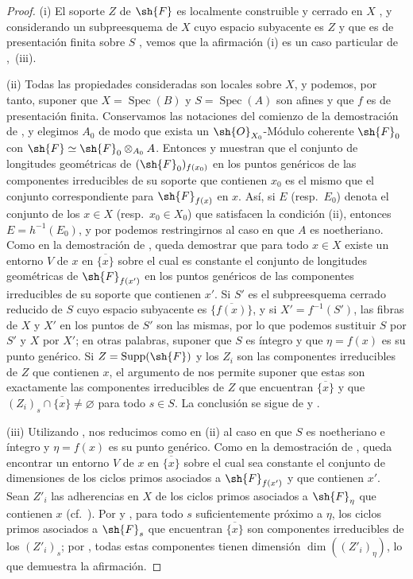 \begin{proof}
\label{IV.9.9.2-proof}
(i) El soporte $Z$ de $\sh{F}$ es localmente construible y cerrado en $X$ , y considerando un subpreesquema de $X$ cuyo espacio subyacente es $Z$ y que es de presentación finita sobre $S$ , vemos que la afirmación (i) es un caso particular de ,~(iii).

(ii) Todas las propiedades consideradas son locales sobre $X$, y podemos, por tanto, suponer que $X=\operatorname{Spec}(B)$ y $S=\operatorname{Spec}(A)$ son afines y que $f$ es de presentación finita.
Conservamos las notaciones del comienzo de la demostración de , y elegimos $A_0$ de modo que exista un $\sh{O}_{X_0}$-Módulo coherente $\sh{F}_0$ con $\sh{F}\simeq\sh{F}_0\otimes_{A_0}A$.
Entonces  y  muestran que el conjunto de longitudes geométricas de $(\sh{F}_0)_{f(x_0)}$ en los puntos genéricos de las componentes irreducibles de su soporte que contienen $x_0$ es el mismo que el conjunto correspondiente para $\sh{F}_{f(x)}$ en $x$.
Así, si $E$ (resp.~$E_0$) denota el conjunto de los $x\in X$ (resp.~$x_0\in X_0$) que satisfacen la condición (ii), entonces $E=h^{-1}(E_0)$, y por  podemos restringirnos al caso en que $A$ es noetheriano.
Como en la demostración de , queda demostrar que para todo $x\in X$ existe un entorno $V$ de $x$ en $\overline{\{x\}}$ sobre el cual es constante el conjunto de longitudes geométricas de $\sh{F}_{f(x')}$ en los puntos genéricos de las componentes irreducibles de su soporte que contienen $x'$.
Si $S'$ es el subpreesquema cerrado reducido de $S$ cuyo espacio subyacente es $\overline{\{f(x)\}}$, y si $X'=f^{-1}(S')$, las fibras de $X$ y $X'$ en los puntos de $S'$ son las mismas,
por lo que podemos sustituir $S$ por $S'$ y $X$ por $X'$; en otras palabras, suponer que $S$ es íntegro y que $\eta=f(x)$ es su punto genérico.
Si $Z=\operatorname{Supp}(\sh{F})$ y los $Z_i$ son las componentes irreducibles de $Z$ que contienen $x$, el argumento de  nos permite suponer que estas son exactamente las componentes irreducibles de $Z$ que encuentran $\overline{\{x\}}$ y que $(Z_i)_s\cap\overline{\{x\}}\neq\varnothing$ para todo $s\in S$.
La conclusión se sigue de  y .

(iii) Utilizando , nos reducimos como en (ii) al caso en que $S$ es noetheriano e íntegro y $\eta=f(x)$ es su punto genérico.
Como en la demostración de , queda encontrar un entorno $V$ de $x$ en $\overline{\{x\}}$ sobre el cual sea constante el conjunto de dimensiones de los ciclos primos asociados a $\sh{F}_{f(x')}$ y que contienen $x'$.
Sean $Z'_i$ las adherencias en $X$ de los ciclos primos asociados a $\sh{F}_\eta$ que contienen $x$ (cf.~).
Por  y , para todo $s$ suficientemente próximo a $\eta$, los ciclos primos asociados a $\sh{F}_s$ que encuentran $\overline{\{x\}}$ son componentes irreducibles de los $(Z'_i)_s$; por , todas estas componentes tienen dimensión $\dim((Z'_i)_\eta)$, lo que demuestra la afirmación.


\end{proof}

